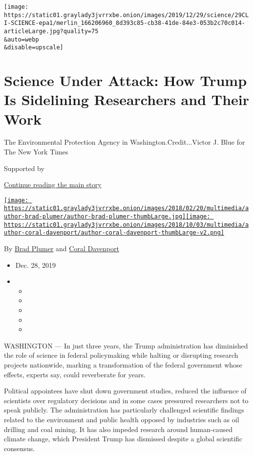 \texttt{[image: https://static01.graylady3jvrrxbe.onion/images/2019/12/29/science/29CLI-SCIENCE-epa1/merlin\_166206960\_8d393c85-cb38-41de-84e3-053b2c70c014-articleLarge.jpg?quality=75\\\&auto=webp\\\&disable=upscale]}

\hypertarget{science-under-attack-how-trump-is-sidelining-researchers-and-their-work}{%
\section{Science Under Attack: How Trump Is Sidelining Researchers and
Their
Work}\label{science-under-attack-how-trump-is-sidelining-researchers-and-their-work}}

The Environmental Protection Agency in Washington.Credit...Victor J.
Blue for The New York Times

Supported by

\protect\hyperlink{after-sponsor}{Continue reading the main story}

\href{https://www.nytimes3xbfgragh.onion/by/brad-plumer}{\texttt{[image: https://static01.graylady3jvrrxbe.onion/images/2018/02/20/multimedia/author-brad-plumer/author-brad-plumer-thumbLarge.jpg]}}\href{https://www.nytimes3xbfgragh.onion/by/coral-davenport}{\texttt{[image: https://static01.graylady3jvrrxbe.onion/images/2018/10/03/multimedia/author-coral-davenport/author-coral-davenport-thumbLarge-v2.png]}}

By \href{https://www.nytimes3xbfgragh.onion/by/brad-plumer}{Brad Plumer}
and \href{https://www.nytimes3xbfgragh.onion/by/coral-davenport}{Coral
Davenport}

\begin{itemize}
\item
  Dec. 28, 2019
\item
  \begin{itemize}
  \item
  \item
  \item
  \item
  \item
  \end{itemize}
\end{itemize}

WASHINGTON --- In just three years, the Trump administration has
diminished the role of science in federal policymaking while halting or
disrupting research projects nationwide, marking a transformation of the
federal government whose effects, experts say, could reverberate for
years.

Political appointees have shut down government studies, reduced the
influence of scientists over regulatory decisions and in some cases
pressured researchers not to speak publicly. The administration has
particularly challenged scientific findings related to the environment
and public health opposed by industries such as oil drilling and coal
mining. It has also impeded research around human-caused climate change,
which President Trump has dismissed despite a global scientific
consensus.

